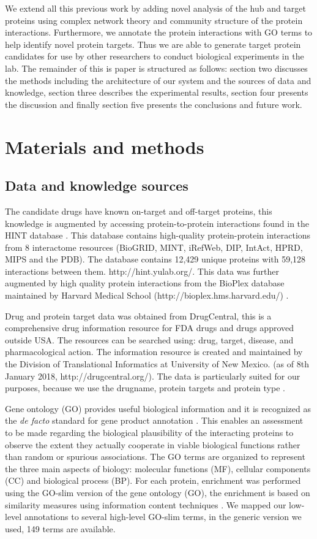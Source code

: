 \documentclass[a4paper,8pt,twocolumn,5p]{elsarticle}
\begin{document}
We extend all this previous work by adding novel analysis of the hub and target proteins using complex network theory and community structure of the protein interactions. Furthermore, we annotate the protein interactions with GO terms to help identify novel protein targets. Thus we are able to generate target protein candidates for use by other researchers to conduct biological experiments in the lab. The remainder of this is paper is structured as follows: section two discusses the methods including the architecture of our system and the sources of data and knowledge, section three describes the experimental  results, section four presents the discussion and finally section five presents the conclusions and future work. 


\section{Materials and methods}
\subsection{Data and knowledge sources}
The candidate drugs have known on-target and off-target proteins, this knowledge is augmented by accessing protein-to-protein interactions found in the HINT database \cite{Das2012}. This database contains high-quality protein-protein interactions from 8 interactome resources (BioGRID, MINT, iRefWeb, DIP, IntAct, HPRD, MIPS and the PDB). The database contains 12,429 unique proteins with 59,128 interactions between them. http://hint.yulab.org/. This data was further augmented by high quality protein interactions from the BioPlex database maintained by Harvard Medical School (http://bioplex.hms.harvard.edu/) \cite{Huttlin2015}.

Drug and protein target data was obtained from DrugCentral, this is a comprehensive drug information resource for FDA drugs and drugs approved outside USA. The resources can be searched using: drug, target, disease, and pharmacological action. The information resource is created and maintained by the Division of Translational Informatics at University of New Mexico. (as of 8th January 2018, http://drugcentral.org/). The data is particularly suited for our purposes, because we use the drugname, protein targets and protein type \cite{Ursu2017}.

Gene ontology (GO) provides useful biological information and it is recognized as the {\it de facto} standard for gene product annotation \cite{Ashburner00}. This enables an assessment to be made regarding the biological plausibility of the interacting proteins to observe the extent they actually cooperate in viable biological functions rather than random or spurious associations. The GO terms are organized to represent the three main aspects of biology: molecular functions (MF), cellular components (CC) and biological process (BP). For each protein, enrichment was performed using the GO-slim version of the gene ontology (GO), the enrichment is based on similarity measures using information content techniques \cite{Davis2010}. We mapped our low-level annotations to several high-level GO-slim terms, in the generic version we used, 149 terms are available.
\end{document}
